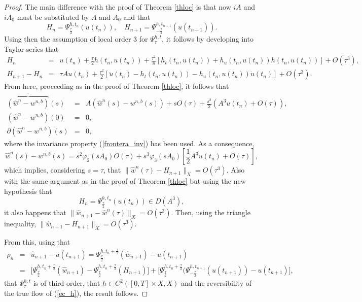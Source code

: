 \documentclass[a4paper,12pt]{article}
\begin{document}
\begin{proof}
The main difference with the proof of Theorem \ref{thloc} is that now $i A$ and $i A_0$ must be substituted by $A$ and $A_0$ and that
$$H_n= \Psi_{\frac{\tau}{2}}^{h,t_n}(u(t_n)), \quad H_{n+1}= \Psi_{-\frac{\tau}{2}}^{h,t_{n+1}}(u(t_{n+1})).$$
Using then the assumption of local order $3$ for $\Psi_{\tau}^{h,t}$, it follows by developing into Taylor series that
\begin{eqnarray}
H_n&=&u(t_n)+\frac{\tau}{2} h(t_n,u(t_n))+\frac{\tau^2}{8}[h_t(t_n,u(t_n))+h_u(t_n,u(t_n))h(t_n,u(t_n))]+O(\tau^3), \nonumber \\
H_{n+1}-H_n&=&\tau A u(t_n)+\frac{\tau^2}{2}[\ddot{u}(t_n)-h_t(t_n,u(t_n))-h_u(t_n,u(t_n))\dot{u}(t_n)]+O(\tau^3). \nonumber
\end{eqnarray}
From here, proceeding as in the proof of Theorem \ref{thloc}, it follows that
\begin{eqnarray}
\stackrel{\cdot}{\overbrace{(\hat{w}^n-w^{n,b})}}(s)&=& A (\hat{w}^n(s)-w^{n,b}(s))+s O(\tau)+\frac{s^2}{2} (A^3 u(t_n) +O(\tau)), \nonumber \\
(\hat{w}^n-w^{n,b})(0)&=&0, \nonumber \\
\partial (\hat{w}^n-w^{n,b})(s)&=&0, \nonumber
\end{eqnarray}
where the invariance property (\ref{frontera_inv}) has been used. As a consequence,
$$
\hat{w}^n(s)-w^{n,b}(s)=s^2 \varphi_2( s A_0) O(\tau)+ s^3 \varphi_3( s A_0) [\frac{1}{2} A^3 u(t_n)+O(\tau)],
$$
which implies, considering $s=\tau$, that $\|\hat{w}^n(\tau)-H_{n+1}\|_X=O(\tau^3)$. Also with the same argument as in the proof of Theorem \ref{thloc} but using the new hypothesis that $$H_n=\Psi_{\frac{\tau}{2}}^{h,t_n}(u(t_n))\in D(A^3),$$
 it also happens that $\|\hat{w}_{n+1}-\hat{w}^n(\tau)\|_X=O(\tau^3)$. Then, using the triangle inequality, $\|\hat{w}_{n+1}-H_{n+1}\|_X =O(\tau^3)$.

From this, using that
\begin{eqnarray}
\rho_n&=&\hat{u}_{n+1}-u(t_{n+1})= \Psi_{\frac{\tau}{2}}^{h,t_n+\frac{\tau}{2}}(\hat{w}_{n+1})-u(t_{n+1}) \nonumber \\
&=& \big[\Psi_{\frac{\tau}{2}}^{h,t_n+\frac{\tau}{2}}(\hat{w}_{n+1})-\Psi_{\frac{\tau}{2}}^{h,t_n+\frac{\tau}{2}}(H_{n+1})\big]+
\big[ \Psi_{\frac{\tau}{2}}^{h,t_n+\frac{\tau}{2}}(\Psi_{-\frac{\tau}{2}}^{h,t_{n+1}}(u(t_{n+1}))-u(t_{n+1}) \big], \nonumber
\end{eqnarray}
that $\Psi_{\tau}^{h,t}$ is of third order, that $h\in C^2([0,T]\times X,X)$ and the reversibility of the true flow of (\ref{ec_h}), the result follows.

\end{proof}
\end{document}
